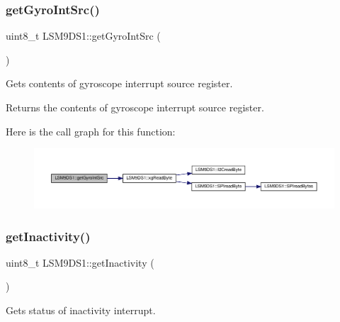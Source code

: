 \subsubsection{\texorpdfstring{get\+Gyro\+Int\+Src()}{getGyroIntSrc()}}
{\footnotesize\ttfamily uint8\+\_\+t L\+S\+M9\+D\+S1\+::get\+Gyro\+Int\+Src (\begin{DoxyParamCaption}{ }\end{DoxyParamCaption})}



Gets contents of gyroscope interrupt source register. 

\begin{DoxyReturn}{Returns}
the contents of gyroscope interrupt source register. 
\end{DoxyReturn}
Here is the call graph for this function\+:
\nopagebreak
\begin{figure}[H]
\begin{center}
\leavevmode
\includegraphics[width=350pt]{classLSM9DS1_aaba6696754df62a411a6a190100f9ca3_cgraph}
\end{center}
\end{figure}
\mbox{\label{classLSM9DS1_a9dab029d1d24e49709258d893042d28f}} 
\subsubsection{\texorpdfstring{get\+Inactivity()}{getInactivity()}}
{\footnotesize\ttfamily uint8\+\_\+t L\+S\+M9\+D\+S1\+::get\+Inactivity (\begin{DoxyParamCaption}{ }\end{DoxyParamCaption})}



Gets status of inactivity interrupt. 

